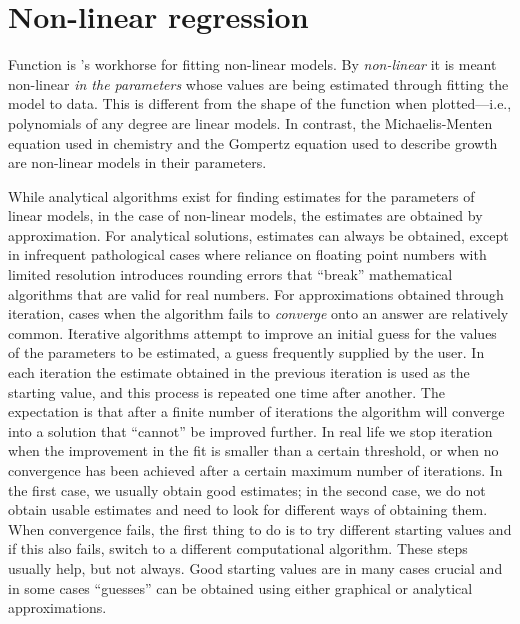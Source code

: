 \documentclass[krantz2]{krantz}\usepackage{knitr}
\begin{document}
\section{Non-linear regression}\label{sec:stat:NLS}
%
%

Function  is \Rlang's workhorse for fitting non-linear models. By \emph{non-linear} it is meant non-linear \emph{in the parameters} whose values are being estimated through fitting the model to data. This is different from the shape of the function when plotted---i.e., polynomials of any degree are linear models. In contrast, the Michaelis-Menten equation used in chemistry and the Gompertz equation used to describe growth are non-linear models in their parameters.

While analytical algorithms exist for finding estimates for the parameters of linear models, in the case of non-linear models, the estimates are obtained by approximation. For analytical solutions, estimates can always be obtained, except in infrequent pathological cases where reliance on floating point numbers with limited resolution introduces rounding errors that ``break'' mathematical algorithms that are valid for real numbers. For approximations obtained through iteration, cases when the algorithm fails to \emph{converge} onto an answer are relatively common. Iterative algorithms attempt to improve an initial guess for the values of the parameters to be estimated, a guess frequently supplied by the user. In each iteration the estimate obtained in the previous iteration is used as the starting value, and this process is repeated one time after another. The expectation is that after a finite number of iterations the algorithm will converge into a solution that ``cannot'' be improved further. In real life we stop iteration when the improvement in the fit is smaller than a certain threshold, or when no convergence has been achieved after a certain maximum number of iterations. In the first case, we usually obtain good estimates; in the second case, we do not obtain usable estimates and need to look for different ways of obtaining them. When convergence fails, the first thing to do is to try different starting values and if this also fails, switch to a different computational algorithm. These steps usually help, but not always. Good starting values are in many cases crucial and in some cases ``guesses'' can be obtained using either graphical or analytical approximations.
\end{document}
